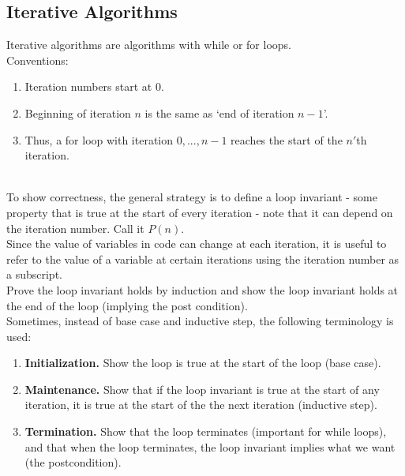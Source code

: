 \documentclass{article}
\begin{document}
\subsection{Iterative Algorithms}
Iterative algorithms are algorithms with while or for loops.\\
Conventions:
    \begin{enumerate}
        \item Iteration numbers start at 0.
        \item Beginning of iteration $n$ is the same as `end of iteration $n-1$'.
        \item Thus, a for loop with iteration $0, ..., n-1$ reaches the start of the $n'$th iteration.
    \end{enumerate}\\

To show correctness, the general strategy is to define a loop invariant - some property that is true at the start of every iteration - note that it can depend on the iteration number. Call it $P(n)$.\\
Since the value of variables in code can change at each iteration, it is useful to refer to the value of a variable at certain iterations using the iteration number as a subscript.\\
Prove the loop invariant holds by induction and show the loop invariant holds at the end of the loop (implying the post condition).\\
Sometimes, instead of base case and inductive step, the following terminology is used:
\begin{enumerate}
    \item \textbf{Initialization.} Show the loop is true at the start of the loop (base case).
    \item \textbf{Maintenance.} Show that if the loop invariant is true at the start of any iteration, it is true at the start of the the next iteration (inductive step).
    \item \textbf{Termination.} Show that the loop terminates (important for while loops), and that when the loop terminates, the loop invariant implies what we want (the postcondition).
\end{enumerate}
\end{document}
